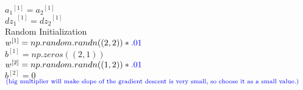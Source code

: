 \documentclass{article}
\begin{document}
${a_1}^{[1]} = {a_2}^{[1]} $\\

${dz_1}^{[1]} = {dz_2}^{[1]} $\\


Random Initialization\\

$w^{[1]} = np.random.randn((2,2)) * \textcolor{blue}{.01}$\\

$b^{[1]} = np.zeros((2,1)) $\\

$w^{[2]} = np.random.randn((1,2)) * \textcolor{blue}{.01}$\\

$b^{[2]} = 0$\\

$_{\textcolor{blue}{\text{(big multiplier will make slope of the gradient descent is very small, so choose it as a small value.)}}}$\\
\end{document}
